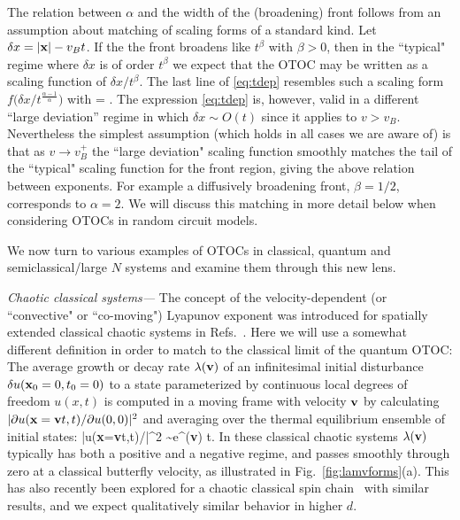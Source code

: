 \documentclass[aps,prl,reprint,superscriptaddress, longbibliography]{revtex4-1}
\newcommand{\vb}{v_B}
\begin{document}
The relation between $\alpha$ and the width of the (broadening) front follows from an assumption about matching of scaling forms of a standard kind.
Let $\delta x = |{\bf x}| - v_B t$.
If the the front broadens like $t^\beta$ with $\beta>0$, then in the ``typical" regime where $\delta x$ is of order $t^\beta$ we expect that the OTOC may be written as a scaling function of $\delta x / t^\beta$. 
The last line of  \eqref{eq:tdep} resembles such a scaling form 
${f\big( {\delta x}/{t^{\frac{\alpha-1}{\alpha}}}\big)}$
with 
\be
\beta = .
\ee
The expression \eqref{eq:tdep} is, however,  valid in a different ``large deviation'' regime in which $\delta x \sim O(t)$ since it applies to $v> \vb$. 
Nevertheless the simplest assumption (which holds in all cases we are aware of) is that as $v \rightarrow \vb^+$ the ``large deviation" scaling function smoothly matches the tail of the ``typical" scaling function for the front region, giving the above relation between exponents. For example a diffusively  broadening front, $\beta = 1/2$, corresponds to $\alpha=2$. We will discuss this matching in more detail below when considering OTOCs in random circuit models.

We now turn to various examples of OTOCs  in classical, quantum and semiclassical/large $N$ systems and examine them through this new lens. 

\emph{Chaotic classical systems---}  The concept of the velocity-dependent (or ``convective" or ``co-moving") Lyapunov exponent was introduced for spatially extended classical chaotic systems in Refs.~.  Here we will use a somewhat different definition in order to match to the classical limit of the quantum OTOC:
The average growth or decay rate $\lambda({\bf v})$ of an infinitesimal initial disturbance $\delta u({\bf x}_0=0,t_0=0)$ to a state parameterized by continuous local degrees of freedom $u(x,t)$ is computed in a moving frame with velocity $\bf v$ by calculating 
$|\partial u({\bf x}={\bf v}t,t)/\partial{u(0,0)}|^2$ and averaging over the thermal equilibrium ensemble of initial states: 
\be\label{eq:classicalquantity}
\left\langle \left|\partial u({\bf x}={\bf v}t,t)/\right|^2 \right\rangle \sim e^{\lambda({\bf v}) t}.
\ee
In these classical chaotic systems $\lambda({\bf v})$ typically has both a positive and a negative regime, and passes smoothly through zero at a classical butterfly velocity, as illustrated in Fig.~\ref{fig:lamvforms}(a).   This has also recently been explored for a chaotic classical spin chain~\cite{DharClassicalSpinChainChaos} with similar results, and we expect qualitatively similar behavior in higher $d$. 
\end{document}

